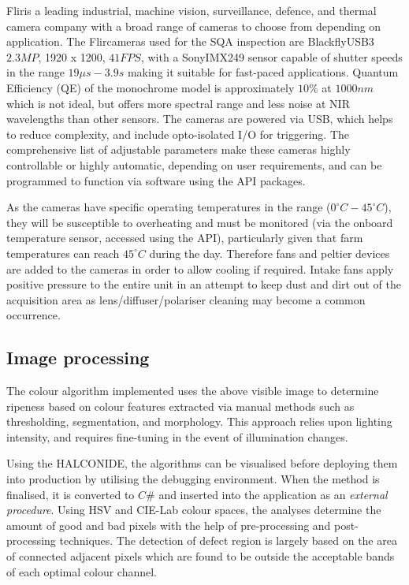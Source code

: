 \documentclass[fleqn,twoside,12pt]{report}
\begin{document}
Flir\textregistered is a leading industrial, machine vision, surveillance, defence, and thermal camera company with a broad range of cameras to choose from depending on application. The Flir\textregistered cameras used for the SQA inspection are Blackfly\textregistered USB3 $2.3 MP$, 1920 x 1200, $41FPS$, with a Sony\textregistered IMX249 sensor capable of shutter speeds in the range $19\mu s-3.9s$ making it suitable for fast-paced applications. Quantum Efficiency (QE) of the monochrome model is approximately $10\%$ at $1000nm$ which is not ideal, but offers more spectral range and less noise at NIR wavelengths than other sensors. The cameras are powered via USB, which helps to reduce complexity, and include opto-isolated I/O for triggering. The comprehensive list of adjustable parameters make these cameras highly controllable or highly automatic, depending on user requirements, and can be programmed to function via software using the API packages. 

As the cameras have specific operating temperatures in the range ($0^{\circ}C-45^{\circ}C$), they will be susceptible to overheating and must be monitored (via the onboard temperature sensor, accessed using the API), particularly given that farm temperatures can reach $45^{\circ}C$ during the day. Therefore fans and peltier devices are added to the cameras in order to allow cooling if required. Intake fans apply positive pressure to the entire unit in an attempt to keep dust and dirt out of the acquisition area as lens/diffuser/polariser cleaning may become a common occurrence.


\subsection{Image processing}


The colour algorithm implemented uses the above visible image to determine ripeness based on colour features extracted via manual methods such as thresholding, segmentation, and morphology. This approach relies upon lighting intensity, and requires fine-tuning in the event of illumination changes. 

Using the HALCON\texttrademark IDE, the algorithms can be visualised before deploying them into production by utilising the debugging environment. When the method is finalised, it is converted to $C\#$ and inserted into the application as an \textit{external procedure}. Using HSV and CIE-Lab colour spaces, the analyses determine the amount of good and bad pixels with the help of pre-processing and post-processing techniques. The detection of defect region is largely based on the area of connected adjacent pixels which are found to be outside the acceptable bands of each optimal colour channel.   
\end{document}
